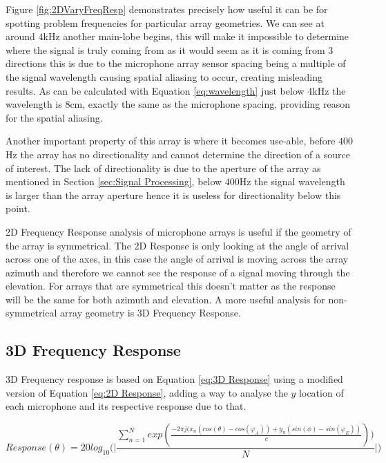 \documentclass{UoNMCHA}
\numberwithin{equation}{section}
\begin{document}
    Figure \ref{fig:2DVaryFreqResp} demonstrates precisely how useful it can be for spotting problem frequencies for particular array geometries. We can see at around $4$kHz another main-lobe begins, this will make it impossible to determine where the signal is truly coming from as it would seem as it is coming from 3 directions this is due to the microphone array sensor spacing being a multiple of the signal wavelength causing spatial aliasing to occur, creating misleading results. As can be calculated with Equation \ref{eq:wavelength} just below 4kHz the wavelength is 8cm, exactly the same as the microphone spacing, providing reason for the spatial aliasing.
    
    Another important property of this array is where it becomes use-able, before $400$Hz the array has no directionality and cannot determine the direction of a source of interest. The lack of directionality is due to the aperture of the array as mentioned in Section \ref{sec:Signal Processing}, below $400$Hz the signal wavelength is larger than the array aperture hence it is useless for directionality below this point.
    
    2D Frequency Response analysis of microphone arrays is useful if the geometry of the array is symmetrical. The 2D Response is only looking at the angle of arrival across one of the axes, in this case the angle of arrival is moving across the array azimuth and therefore we cannot see the response of a signal moving through the elevation. For arrays that are symmetrical this doesn't matter as the response will be the same for both azimuth and elevation. A more useful analysis for non-symmetrical array geometry is 3D Frequency Response.
\subsection{3D Frequency Response} \label{sec:3D Freq Response}
    3D Frequency response is based on Equation \ref{eq:3D Response} using a modified version of Equation \ref{eq:2D Response}, adding a way to analyse the $y$ location of each microphone and its respective response due to that.
    
    \begin{equation}
        Response(\theta) = 20log_{10} \Big( \Big|\frac{\sum_{n=1}^N exp(\frac{-2\pi j(x_n(cos(\theta)-cos(\varphi_A))+y_n(sin(\phi)-sin(\varphi_E))}{c}))}{N}\Big| \Big)
        \label{eq:3D Response}
    \end{equation}
    
\end{document}
